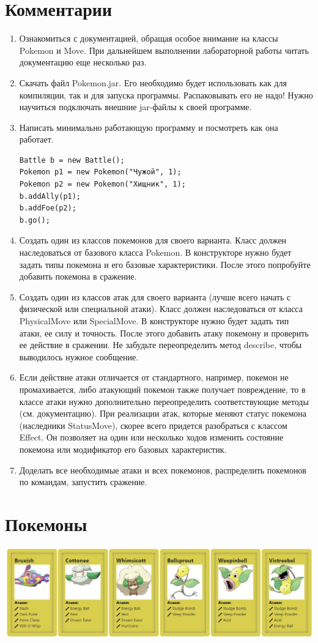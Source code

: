 \section{Комментарии}
\begin{enumerate}
  \item Ознакомиться с документацией, обращая особое внимание на классы Pokemon и Move. При дальнейшем выполнении лабораторной работы читать документацию еще несколько раз.
  \item Скачать файл Pokemon.jar. Его необходимо будет использовать как для компиляции, так и для запуска программы. Распаковывать его не надо! Нужно научиться подключать внешние jar-файлы к своей программе.
  \item Написать минимально работающую программу и посмотреть как она работает.
        \begin{lstlisting}
Battle b = new Battle();
Pokemon p1 = new Pokemon("Чужой", 1);
Pokemon p2 = new Pokemon("Хищник", 1);
b.addAlly(p1);
b.addFoe(p2);
b.go();
\end{lstlisting}
  \item Создать один из классов покемонов для своего варианта. Класс должен наследоваться от базового класса Pokemon. В конструкторе нужно будет задать типы покемона и его базовые характеристики. После этого попробуйте добавить покемона в сражение.
  \item Создать один из классов атак для своего варианта (лучше всего начать с физической или специальной атаки). Класс должен наследоваться от класса PhysicalMove или SpecialMove. В конструкторе нужно будет задать тип атаки, ее силу и точность. После этого добавить атаку покемону и проверить ее действие в сражении. Не забудьте переопределить метод describe, чтобы выводилось нужное сообщение.
  \item Если действие атаки отличается от стандартного, например, покемон не промахивается, либо атакующий покемон также получает повреждение, то в классе атаки нужно дополнительно переопределить соответствующие методы (см. документацию). При реализации атак, которые меняют статус покемона (наследники StatusMove), скорее всего придется разобраться с классом Effect. Он позволяет на один или несколько ходов изменить состояние покемона или модификатор его базовых характеристик.
  \item Доделать все необходимые атаки и всех покемонов, распределить покемонов по командам, запустить сражение.
\end{enumerate}

\section{Покемоны}
\begin{center}
  \includegraphics[scale=0.5]{pokemons.jpg}
\end{center}

